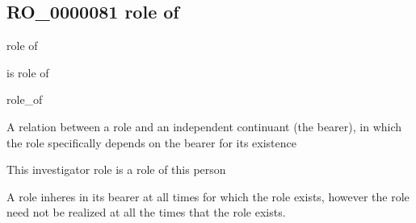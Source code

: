 \documentclass[letterpaper,10pt,english]{sphinxmanual}
\begin{document}
\subsection{RO\_0000081 \sphinxhyphen{} role of}
\label{\detokenize{doc-RO_0000081:ro-0000081-role-of}}\label{\detokenize{doc-RO_0000081:index-0}}\label{\detokenize{doc-RO_0000081::doc}}
\begin{sphinxShadowBox}

\sphinxAtStartPar
role of
\end{sphinxShadowBox}

\begin{sphinxShadowBox}

\sphinxAtStartPar
is role of

\sphinxAtStartPar
role\_of
\end{sphinxShadowBox}

\begin{sphinxShadowBox}

\sphinxAtStartPar
{\hyperref[\detokenize{doc-RO_0000052::doc}]{}}
\end{sphinxShadowBox}

\begin{sphinxShadowBox}

\sphinxAtStartPar
A relation between a role and an independent continuant (the bearer), in which the role specifically depends on the bearer for its existence
\end{sphinxShadowBox}

\begin{sphinxShadowBox}

\sphinxAtStartPar
This investigator role is a role of this person
\end{sphinxShadowBox}

\begin{sphinxShadowBox}

\sphinxAtStartPar
A role inheres in its bearer at all times for which the role exists, however the role need not be realized at all the times that the role exists.
\end{sphinxShadowBox}

\begin{sphinxShadowBox}

\sphinxAtStartPar
{}
\end{sphinxShadowBox}
\begin{quote}

\ignorespaces \end{quote}
\end{document}

